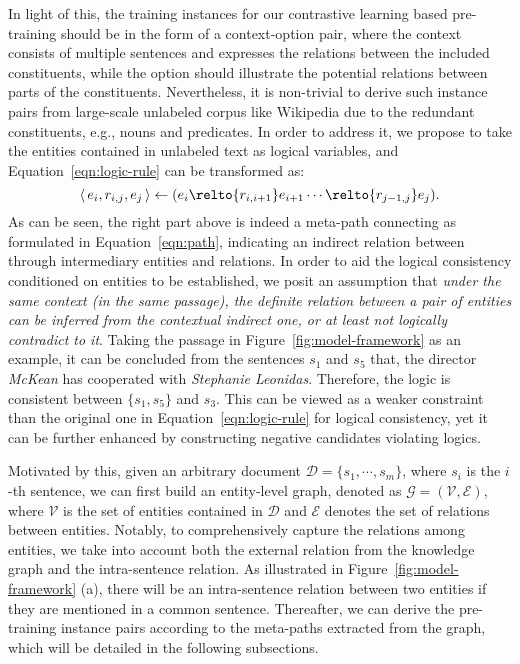In light of this, the training instances for our contrastive learning based pre-training should be in the form of a context-option pair, where the context consists of multiple sentences and expresses the relations between the included constituents, while the option should illustrate the potential relations between parts of the constituents.  
Nevertheless, it is non-trivial to derive such instance pairs from large-scale unlabeled corpus like Wikipedia due to the redundant constituents, e.g., nouns and predicates.
In order to address it, we propose to take the entities contained in unlabeled text as logical variables, and Equation~\ref{eqn:logic-rule} can be transformed as:
\begin{equation}
    \langle\,e_{i},r_{{i},{j}},e_{j}\,\rangle \gets (e_i\relto{r_{i,i+1}} e_{i+1} \cdots \relto{r_{j-1,j}}e_j).
    \label{eqn:ent-logic-rule}
\end{equation}
As can be seen, the right part above is indeed a meta-path connecting  as formulated in Equation~\ref{eqn:path}, indicating an indirect relation between  through intermediary entities and relations.
In order to aid the logical consistency conditioned on entities to be established, we posit an  assumption that
\textit{under the same context (in the same passage), the definite relation between a  pair of entities can be inferred from the contextual indirect one, or at least not logically contradict to it}.
Taking the passage in Figure~\ref{fig:model-framework} as an example, 
it can be concluded from the sentences $s_1$ and $s_5$ that, the director \textit{McKean} has cooperated with \textit{Stephanie Leonidas}. 
Therefore, the logic is consistent between $\{s_1,s_5\}$ and $s_3$.
This can be viewed as a weaker constraint than the original one in Equation~\ref{eqn:logic-rule} for logical consistency, yet it can be further enhanced by constructing negative candidates violating logics.



Motivated by this, given an arbitrary document $\mathcal{D}=\{s_1,\cdots,s_m\}$, where $s_i$ is the $i$-th sentence,
we can first build an entity-level graph, denoted as $\mathcal{G}=(\mathcal{V},\mathcal{E})$, where $\mathcal{V}$ is the set of entities contained in $\mathcal{D}$ and $\mathcal{E}$ denotes the set of relations between entities. 
Notably, to comprehensively capture the relations among entities, we take into account both the external relation from the knowledge graph and the intra-sentence relation. As illustrated in Figure~\ref{fig:model-framework} (a), there will be an intra-sentence relation between two entities if they are mentioned in a common sentence.
Thereafter, we can derive the pre-training instance pairs according to the meta-paths extracted from the graph, which will be detailed in the following subsections.




















